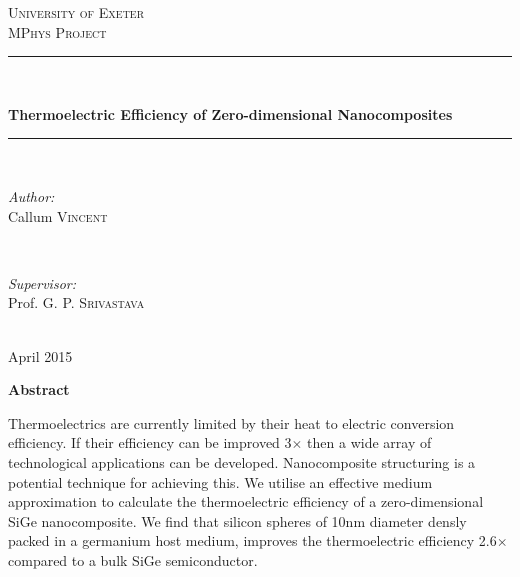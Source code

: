 \documentclass[12pt,draft]{article}
\begin{document}
\begin{titlepage}
\center
\textsc{\huge University of Exeter}\\[1cm]
\textsc{\Large MPhys Project}\\[1.5cm]

\rule{\linewidth}{0.5mm}\\[0.4cm]
\begin{doublespace}
{\LARGE \textbf{Thermoelectric Efficiency of Zero-dimensional Nanocomposites}}\\[0cm]
\end{doublespace}
\rule{\linewidth}{0.5mm}\\[2.5cm]
 
\begin{minipage}{0.4\textwidth}
\begin{flushleft} \large
\emph{Author:}\\
Callum \textsc{Vincent}
\end{flushleft}
\end{minipage}
~
\begin{minipage}{0.4\textwidth}
\begin{flushright} \large
\emph{Supervisor:} \\
Prof. G. P. \textsc{Srivastava}
\end{flushright}
\end{minipage}\\[4cm]

{\large April 2015}

\pagedecorationleft
\pagedecorationright
\end{titlepage}

\begin{center}
{\Huge\textbf{Abstract}}\\[2cm]
\end{center}
\begin{justify}
Thermoelectrics are currently limited by their heat to electric conversion efficiency. If their efficiency can be improved 3$\times$ then a wide array of technological applications can be developed. Nanocomposite structuring is a potential technique for achieving this. We utilise an effective medium approximation to calculate the thermoelectric efficiency of a zero-dimensional SiGe nanocomposite. We find that silicon spheres of 10nm diameter densly packed in a germanium host medium, improves the thermoelectric efficiency 2.6$\times$ compared to a bulk SiGe semiconductor.
\end{justify}
\end{document}
